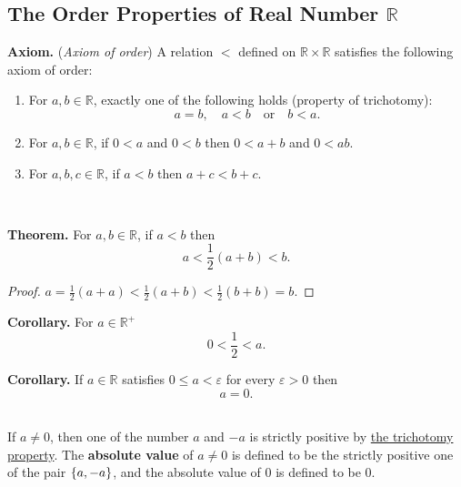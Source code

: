 \documentclass[12pt,a4paper]{article}
\begin{document}
\subsection{The Order Properties of Real Number $\mathbb{R}$}
\begin{tcolorbox}[colback=white]
	\textbf{Axiom.} (\textit{Axiom of order}) A relation $<$ defined on $\mathbb{R}\times\mathbb{R}$ satisfies the following axiom of order: \begin{enumerate}
		\item  \hypertarget{trichotomy}{}For $a,b\in\mathbb{R}$, exactly one of the following holds (property of trichotomy): \[
		a=b,\quad a<b\quad \text{or}\quad b<a.
		\]
		\item For $a,b\in\mathbb{R}$, if $0<a$ and $0<b$ then $0<a+b$ and $0<ab$.
		\item For $a,b,c\in\mathbb{R}$, if $a<b$ then $a+c<b+c$.
	\end{enumerate}
\end{tcolorbox}
\
\begin{tcolorbox}[colback=white]
	\textbf{Theorem.} For $a,b\in\mathbb{R}$, if $a<b$ then \[
	a<\frac{1}{2}(a+b)<b.
	\]\begin{proof}
		\(a=\frac{1}{2}(a+a)<\frac{1}{2}(a+b)<\frac{1}{2}(b+b)=b \).
	\end{proof}
\end{tcolorbox}
\begin{tcolorbox}[colback=white]
	\textbf{Corollary.} For $a\in\mathbb{R}^+$ \[
	0<\frac{1}{2}<a.
	\]
\end{tcolorbox}
\begin{tcolorbox}[colback=white]
	\textbf{Corollary.} If $a\in\mathbb{R}$ satisfies $0\leq a<\varepsilon$ for every $\varepsilon>0$ then \[
	a=0.
	\]
\end{tcolorbox}\
\\
If $a\neq0$, then one of the number $a$ and $-a$ is strictly positive by \hyperlink{trichotomy}{the trichotomy property}. The \textbf{absolute value} of $a\neq0$ is defined to be the strictly positive one of the pair $\set{a, -a}$, and the absolute value of 0 is defined to be 0.
\end{document}
